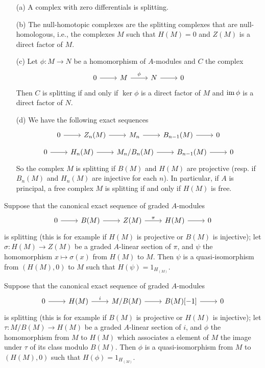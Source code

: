 \begin{example}
\mbox{}
\begin{itemize}
\item[(a)] A complex with zero differentials is splitting.
\item[(b)] The null-homotopic complexes are the splitting complexes that are null-homologous, i.e., the complexes $M$ such that $H(M)=0$ and $Z(M)$ is a direct factor of $M$.
\item[(c)] Let $\phi:M\to N$ be a homomorphism of $A$-modules and $C$ the complex
\[\begin{tikzcd}
0\ar[r]&M\ar[r,"\phi"]&N\ar[r]&0
\end{tikzcd}\] 
Then $C$ is splitting if and only if $\ker\phi$ is a direct factor of $M$ and $\operatorname{im}\phi$ is a direct factor of $N$.
\item[(d)] We have the following exact sequences
\[
\begin{tikzcd}
0\ar[r]&Z_n(M)\ar[r]&M_n\ar[r]&B_{n-1}(M)\ar[r]&0
\end{tikzcd}\]
\[
\begin{tikzcd}
0\ar[r]&H_n(M)\ar[r]&M_n/B_n(M)\ar[r]&B_{n-1}(M)\ar[r]&0
\end{tikzcd}\]
So the complex $M$ is splitting if $B(M)$ and $H(M)$ are projective (resp. if $B_n(M)$ and $H_n(M)$ are injective for each $n$). In particular, if $A$ is principal, a free complex $M$ is splitting if and only if $H(M)$ is free.
\end{itemize}
\end{example}
\begin{remark}\label{module complex B and H split induce quasi-iso from H(M) to M}
Suppose that the canonical exact sequence of graded $A$-modules
\[\begin{tikzcd}
0\ar[r]&B(M)\ar[r]&Z(M)\ar[r,"\pi"]&H(M)\ar[r]&0
\end{tikzcd}\]
is splitting (this is for example if $H(M)$ is projective or $B(M)$ is injective); let $\sigma:H(M)\to Z(M)$ be a graded $A$-linear section of $\pi$, and $\psi$ the homomorphism $x\mapsto\sigma(x)$ from $H(M)$ to $M$. Then $\psi$ is a quasi-isomorphism from $(H(M),0)$ to $M$ such that $H(\psi)=1_{H_(M)}$.
\end{remark}
\begin{remark}\label{module complex H and B[-1] split induce quasi-iso from M to H(M)}
Suppose that the canonical exact sequence of graded $A$-modules
\[\begin{tikzcd}
0\ar[r]&H(M)\ar[r,"i"]&M/B(M)\ar[r]&B(M)[-1]\ar[r]&0
\end{tikzcd}\]
is splitting (this is for example if $B(M)$ is projective or $H(M)$ is injective); let $\tau:M/B(M)\to H(M)$ be a graded $A$-linear section of $i$, and $\phi$ the homomorphism from $M$ to $H(M)$ which associates a element of $M$ the image under $\tau$ of its class modulo $B(M)$. Then $\phi$ is a quasi-isomorphism from $M$ to $(H(M),0)$ such that $H(\phi)=1_{H_(M)}$.
\end{remark}
